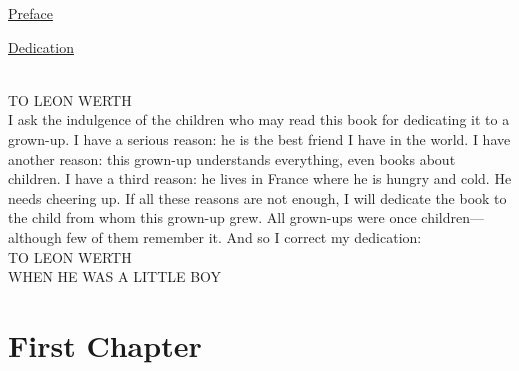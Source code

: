 \documentclass{book}
\begin{document}
\begin{center}
\underline {Preface}\\
\end{center}

\lipsum[1-2]
\newpage

\begin{center}
\underline {Dedication}\\
\end{center}\\

TO LEON WERTH\\

I ask the indulgence of the children who may read this book for dedicating it to a grown-up. I have a serious reason: he is the best friend I have in the world. I have another reason: this grown-up understands everything, even books about children. I have a third reason: he lives in France where he is hungry and cold. He needs cheering up. If all these reasons are not enough, I will dedicate the book to the child from whom this grown-up grew. All grown-ups were once children—although few of them remember it. And so I correct my dedication:\\

TO LEON WERTH\\
WHEN HE WAS A LITTLE BOY





\tableofcontents

\chapter{First Chapter}
\lipsum[1-3]
\end{document}
